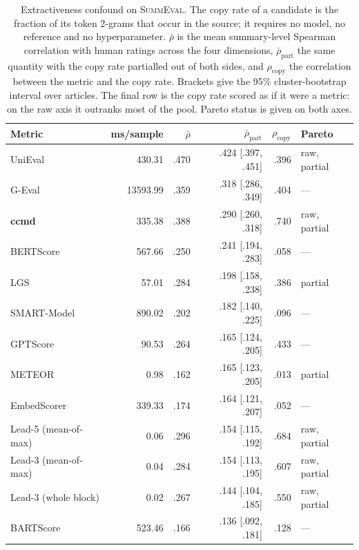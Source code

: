 \begin{table}[t]
\centering
\caption{Extractiveness confound on \textsc{SummEval}. The copy rate of a candidate is the fraction of its token 2-grams that occur in the source; it requires no model, no reference and no hyperparameter. $\bar{\rho}$ is the mean summary-level Spearman correlation with human ratings across the four dimensions, $\bar{\rho}_{\mathrm{part}}$ the same quantity with the copy rate partialled out of both sides, and $\rho_{\mathrm{copy}}$ the correlation between the metric and the copy rate. Brackets give the 95\% cluster-bootstrap interval over articles. The final row is the copy rate scored as if it were a metric: on the raw axis it outranks most of the pool. Pareto status is given on both axes.}
\label{tab:confound}
\small
\linespread{1}\selectfont
\setlength{\tabcolsep}{4pt}
\begin{tabular}{@{}lrrrrl@{}}
\toprule
Metric & ms/sample & $\bar{\rho}$ & $\bar{\rho}_{\mathrm{part}}$ & $\rho_{\mathrm{copy}}$ & Pareto \\
\midrule
UniEval & 430.31 & .470 & .424 {\scriptsize [.397, .451]} & .396 & raw, partial \\
G-Eval & 13593.99 & .359 & .318 {\scriptsize [.286, .349]} & .404 & --- \\
\textbf{ccmd} & 335.38 & .388 & .290 {\scriptsize [.260, .318]} & .740 & raw, partial \\
BERTScore & 567.66 & .250 & .241 {\scriptsize [.194, .283]} & .058 & --- \\
LGS & 57.01 & .284 & .198 {\scriptsize [.158, .238]} & .386 & partial \\
SMART-Model & 890.02 & .202 & .182 {\scriptsize [.140, .225]} & .096 & --- \\
GPTScore & 90.53 & .264 & .165 {\scriptsize [.124, .205]} & .433 & --- \\
METEOR & 0.98 & .162 & .165 {\scriptsize [.123, .205]} & .013 & partial \\
EmbedScorer & 339.33 & .174 & .164 {\scriptsize [.121, .207]} & .052 & --- \\
Lead-5 (mean-of-max) & 0.06 & .296 & .154 {\scriptsize [.115, .192]} & .684 & raw, partial \\
Lead-3 (mean-of-max) & 0.04 & .284 & .154 {\scriptsize [.113, .195]} & .607 & raw, partial \\
Lead-3 (whole block) & 0.02 & .267 & .144 {\scriptsize [.104, .185]} & .550 & raw, partial \\
BARTScore & 523.46 & .166 & .136 {\scriptsize [.092, .181]} & .128 & --- \\

\end{tabular}
\end{table}
